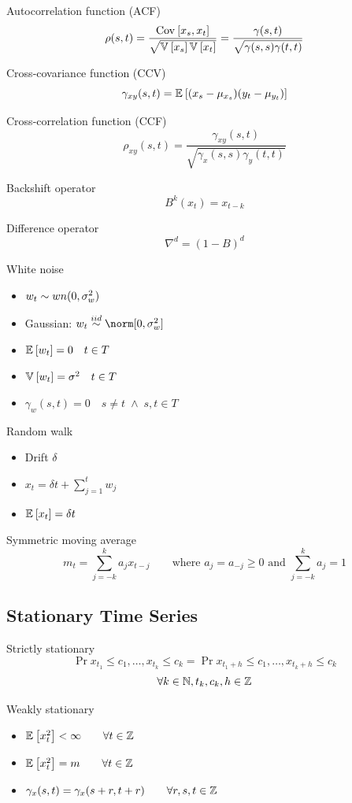 \documentclass[landscape]{article}
\begin{document}
\begin{multicols*}{2}
Autocorrelation function (ACF)
\[\rho(s,t) = \frac{\mathrm{Cov}_{}\left[x_s,x_t\right]}{\sqrt{\mathbb{V}_{}\left[x_s\right]\mathbb{V}_{}\left[x_t\right]}}
            = \frac{\gamma(s,t)}{\sqrt{\gamma(s,s)\gamma(t,t)}}\]

Cross-covariance function (CCV)
\[\gamma_{xy}(s,t) = \mathbb{E}_{}\left[(x_s-\mu_{x_s})(y_t-\mu_{y_t})\right]\]

Cross-correlation function (CCF)
\[\rho_{xy}(s,t) = \frac{\gamma_{xy}(s,t)}{\sqrt{\gamma_x(s,s)\gamma_y(t,t)}}\]

Backshift operator
\[B^k(x_t) = x_{t-k}\]

Difference operator
\[\nabla^d = (1-B)^d\]

White noise
\begin{itemize}
  \item $w_t \sim wn(0, \sigma_w^2)$
  \item Gaussian: $w_t \distiid \norm[0, \sigma_w^2]$
  \item $\mathbb{E}_{}\left[w_t\right] = 0 \quad t\in T$
  \item $\mathbb{V}_{}\left[w_t\right] = \sigma^2 \quad t\in T$
  \item $\gamma_w(s,t) = 0 \quad s \neq t \;\wedge\; s,t\in T$
\end{itemize}


Random walk
\begin{itemize}
  \item Drift $\delta$
  \item $x_t = \delta t + \sum_{j=1}^t w_j$
  \item $\mathbb{E}_{}\left[x_t\right] = \delta t$
\end{itemize}

Symmetric moving average
\[m_t = \sum_{j=-k}^k a_j x_{t-j}
\qquad \text{where } a_j=a_{-j}\ge0 \text{ and } \sum_{j=-k}^k a_j = 1\]

\subsection{Stationary Time Series}

Strictly stationary
\[\Pr{x_{t_1} \le c_1, \dots, x_{t_k} \le c_k} =
  \Pr{x_{t_1+h} \le c_1, \dots, x_{t_k+h} \le c_k}\]
\[\forall k\in\mathbb{N},t_k, c_k, h\in\mathbb{Z}\]

Weakly stationary
\begin{itemize}
  \item $\mathbb{E}_{}\left[x_t^2\right] < \infty \qquad\forall t\in\mathbb{Z}$
  \item $\mathbb{E}_{}\left[x_t^2\right] = m \qquad\forall t\in\mathbb{Z}$
  \item $\gamma_x(s,t) = \gamma_x(s+r, t+r) \qquad\forall r,s,t\in\mathbb{Z}$
\end{itemize}


\end{multicols*}
\end{document}
